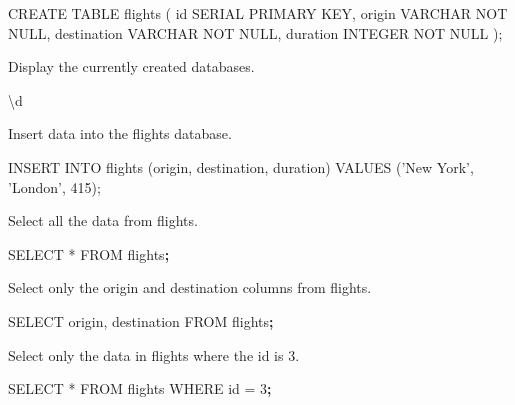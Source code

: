 \documentclass[]{book}
\newenvironment{Shaded}{\begin{snugshade}}{\end{snugshade}}
\newcommand{\KeywordTok}[1]{\textcolor[rgb]{0.13,0.29,0.53}{\textbf{#1}}}
\newcommand{\StringTok}[1]{\textcolor[rgb]{0.31,0.60,0.02}{#1}}
\newcommand{\FunctionTok}[1]{\textcolor[rgb]{0.00,0.00,0.00}{#1}}
\newcommand{\ExtensionTok}[1]{#1}
\newcommand{\NormalTok}[1]{#1}
\begin{document}
\begin{Shaded}
\begin{Highlighting}[]
\ExtensionTok{CREATE}\NormalTok{ TABLE flights (           }
    \FunctionTok{id}\NormalTok{ SERIAL PRIMARY KEY,       }
    \ExtensionTok{origin}\NormalTok{ VARCHAR NOT NULL,     }
    \ExtensionTok{destination}\NormalTok{ VARCHAR NOT NULL,}
    \ExtensionTok{duration}\NormalTok{ INTEGER NOT NULL    }
\NormalTok{);                               }
\end{Highlighting}
\end{Shaded}

Display the currently created databases.

\begin{Shaded}
\begin{Highlighting}[]
\NormalTok{\textbackslash{}}\ExtensionTok{d}
\end{Highlighting}
\end{Shaded}

Insert data into the flights database.

\begin{Shaded}
\begin{Highlighting}[]
\ExtensionTok{INSERT}\NormalTok{ INTO flights (origin, destination, duration) }\ExtensionTok{VALUES}\NormalTok{ (}\StringTok{'New York'}\NormalTok{, }\StringTok{'London'}\NormalTok{, 415);}
\end{Highlighting}
\end{Shaded}

Select all the data from flights.

\begin{Shaded}
\begin{Highlighting}[]
\ExtensionTok{SELECT}\NormalTok{ * FROM flights}\KeywordTok{;}
\end{Highlighting}
\end{Shaded}

Select only the origin and destination columns from flights.

\begin{Shaded}
\begin{Highlighting}[]
\ExtensionTok{SELECT}\NormalTok{ origin, destination FROM flights}\KeywordTok{;}
\end{Highlighting}
\end{Shaded}

Select only the data in flights where the id is 3.

\begin{Shaded}
\begin{Highlighting}[]
\ExtensionTok{SELECT}\NormalTok{ * FROM flights WHERE id = 3}\KeywordTok{;}
\end{Highlighting}
\end{Shaded}
\end{document}
